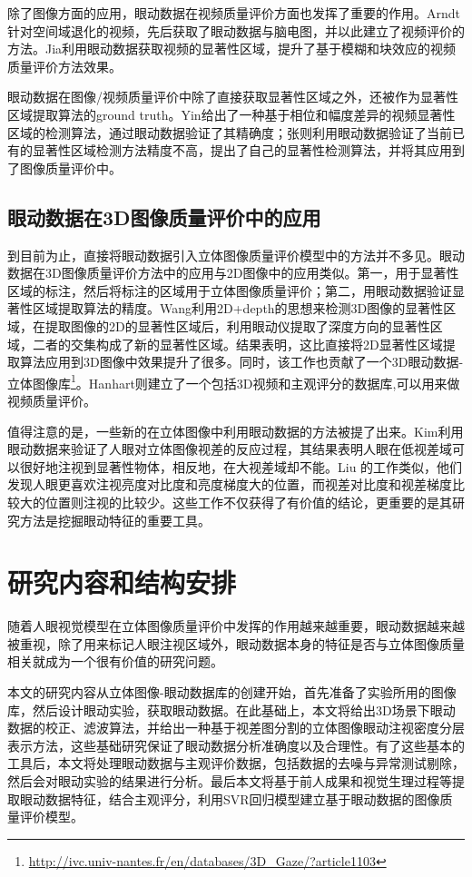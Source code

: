 除了图像方面的应用，眼动数据在视频质量评价方面也发挥了重要的作用。Arndt针对空间域退化的视频，先后获取了眼动数据与脑电图，并以此建立了视频评价的方法\parencite{arndt2014using}。Jia利用眼动数据获取视频的显著性区域，提升了基于模糊和块效应的视频质量评价方法效果\parencite{jia2014no}。

眼动数据在图像/视频质量评价中除了直接获取显著性区域之外，还被作为显著性区域提取算法的ground truth。Yin给出了一种基于相位和幅度差异的视频显著性区域的检测算法，通过眼动数据验证了其精确度\parencite{yin2013video}；张\parencite{zhang2013conside}则利用眼动数据验证了当前已有的显著性区域检测方法精度不高，提出了自己的显著性检测算法，并将其应用到了图像质量评价中。
\subsection{眼动数据在3D图像质量评价中的应用}
\label{sec:eyetrackapplied3D}
到目前为止，直接将眼动数据引入立体图像质量评价模型中的方法并不多见。眼动数据在3D图像质量评价方法中的应用与2D图像中的应用类似。第一，用于显著性区域的标注，然后将标注的区域用于立体图像质量评价\parencite{chung2004visual,wang2013computational}；第二，用眼动数据验证显著性区域提取算法的精度。Wang利用2D+depth的思想来检测3D图像的显著性区域\parencite{wang2013computational}，在提取图像的2D的显著性区域后，利用眼动仪提取了深度方向的显著性区域，二者的交集构成了新的显著性区域。结果表明，这比直接将2D显著性区域提取算法应用到3D图像中效果提升了很多。同时，该工作也贡献了一个3D眼动数据-立体图像库\footnote{ \url{http://ivc.univ-nantes.fr/en/databases/3D_Gaze/?article1103}}。Hanhart则建立了一个包括3D视频和主观评分的数据库\parencite{hanhart2014eyec3d},可以用来做视频质量评价。

值得注意的是，一些新的在立体图像中利用眼动数据的方法被提了出来。Kim利用眼动数据来验证了人眼对立体图像视差的反应过程，其结果表明人眼在低视差域可以很好地注视到显著性物体，相反地，在大视差域却不能\parencite{kim2014saliency}。Liu 的工作类似\parencite{liu2010dichotomy}，他们发现人眼更喜欢注视亮度对比度和亮度梯度大的位置，而视差对比度和视差梯度比较大的位置则注视的比较少。这些工作不仅获得了有价值的结论，更重要的是其研究方法是挖掘眼动特征的重要工具。
\section{研究内容和结构安排}
\label{sec:arrangement}
随着人眼视觉模型在立体图像质量评价中发挥的作用越来越重要，眼动数据越来越被重视，除了用来标记人眼注视区域外，眼动数据本身的特征是否与立体图像质量相关就成为一个很有价值的研究问题。

本文的研究内容从立体图像-眼动数据库的创建开始，首先准备了实验所用的图像库，然后设计眼动实验，获取眼动数据。在此基础上，本文将给出3D场景下眼动数据的校正、滤波算法，并给出一种基于视差图分割的立体图像眼动注视密度分层表示方法，这些基础研究保证了眼动数据分析准确度以及合理性。有了这些基本的工具后，本文将处理眼动数据与主观评价数据，包括数据的去噪与异常测试剔除，然后会对眼动实验的结果进行分析。最后本文将基于前人成果和视觉生理过程等提取眼动数据特征，结合主观评分，利用SVR回归模型建立基于眼动数据的图像质量评价模型。

